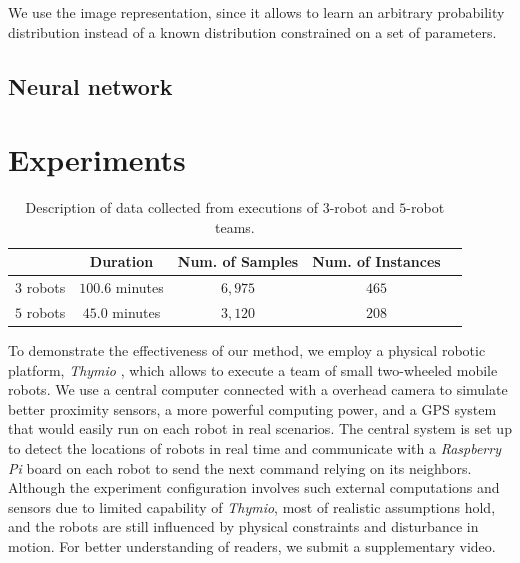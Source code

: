 \documentclass[letterpaper, 10 pt, conference]{ieeeconf}  %
\begin{document}
	We use the image representation, since it allows to learn an arbitrary probability distribution 
	instead of a known distribution constrained on a set of parameters.
	
	
	\subsection{Neural network}
	\label{sec:neural_network}
	 
	
	
	\section{Experiments} 
	\label{sec:experiments} 
	
	
	\begin{table}[t]
		\label{table:data_description}
		\centering
		\begin{tabular}{|c|c|c|c|c|}
			\hline
						&  Duration & Num. of Samples & Num. of Instances  \\ \hline
			$3$ robots & $100.6$ minutes & $6,975$ & $465$  \\ \hline
			$5$ robots & $45.0$ minutes  & $3,120$ & $208$  \\ \hline
		\end{tabular}
		\caption{Description of data collected from executions of $3$-robot and $5$-robot teams.}
	\end{table}

	
	
	To demonstrate the effectiveness of our method, we employ a physical robotic platform, 
	\emph{Thymio} \cite{Shin14}, which allows to execute a team of small two-wheeled mobile robots.   
	We use a central computer connected with a overhead camera to simulate better proximity 
	sensors, a more powerful computing power, and a GPS system that would easily run on each robot in 
	real scenarios. The central system is set up to detect the locations of robots in real time 
	and communicate with a \emph{Raspberry Pi} board \cite{Upton14} on each robot to send
	the next command relying on its neighbors. Although the experiment configuration involves 
	such external computations and sensors due to limited capability of \emph{Thymio}, 
	most of realistic assumptions hold, and the robots are still influenced by 
	physical constraints and disturbance in motion. For better understanding of readers, 
	we submit a supplementary video. 
	
\end{document}
